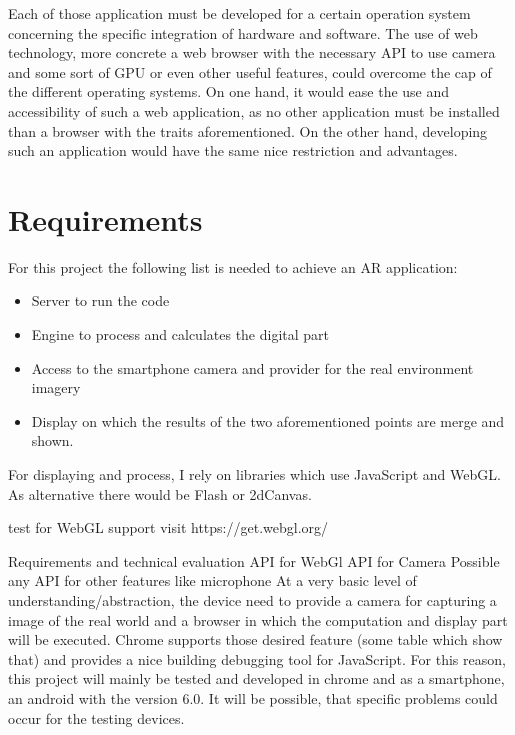 Each of those application must be developed for a certain operation system concerning the specific integration of hardware and software. 
The use of web technology, more concrete a web browser with the necessary API to use camera and some sort of GPU or even other useful features, could overcome the cap of the different operating systems. On one hand, it would ease the use and accessibility of such a web application, as no other application must be installed than a browser with the traits aforementioned. On the other hand, developing such an application would have the same nice restriction and advantages.





\section{Requirements}

For this project the following list is needed to achieve an AR application:
\begin{itemize}
    \item Server to run the code
    \item Engine to process and calculates the digital part
    \item Access to the smartphone camera and provider for the real environment imagery
    \item Display on which the results of the two aforementioned points are merge and shown.
\end{itemize}

For displaying and process, I rely on libraries which use JavaScript and WebGL. As alternative there would be Flash or 2dCanvas.

test for WebGL support visit https://get.webgl.org/



Requirements and technical evaluation
API for WebGl
API for Camera
Possible any API for other features like microphone
At a very basic level of understanding/abstraction, the device need to provide a camera for capturing a image of the real world and a browser in which the computation and display part will be executed. 
Chrome supports those desired feature (some table which show that) and provides a nice building debugging tool for JavaScript. For this reason, this project will mainly be tested and developed in chrome and as a smartphone, an android with the version 6.0. It will be possible, that specific problems could occur for the testing devices.









